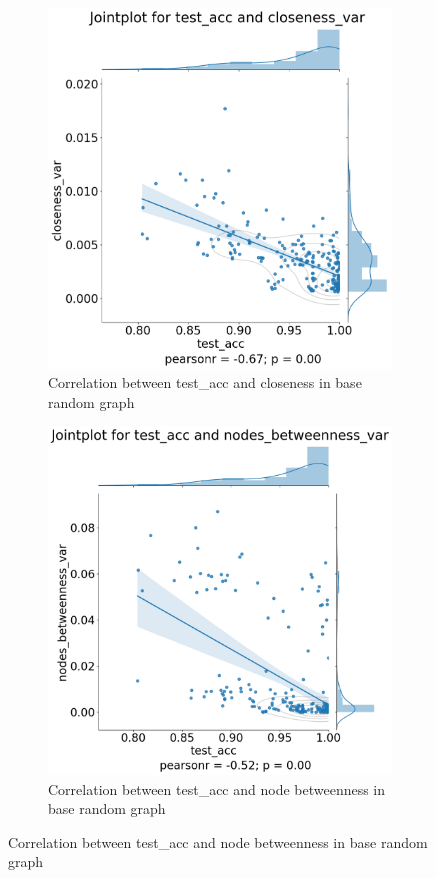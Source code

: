 \begin{figure}[H]
    \centering
    \begin{subfigure}{0.45\textwidth}
        \includegraphics[width=\linewidth]{images/results/random/gru/jointplot_test_acc_closeness_var.png}
        \caption{Correlation between test\_acc and closeness in base random graph} \label{fig:jp_gru_close}
    \end{subfigure}
    \hfill
    \begin{subfigure}{0.45\textwidth}
        \includegraphics[width=\linewidth]{images/results/random/gru/jointplot_test_acc_nodes_betweenness_var.png}
        \caption{Correlation between test\_acc and node betweenness in base random graph} \label{fig:jp_gru_node_bn}
    \end{subfigure}


\end{figure}
